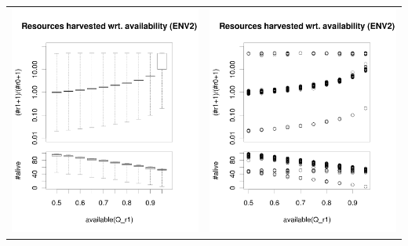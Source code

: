 \documentclass[a4paper,10pt]{article}
\begin{document}
\begin{table}[H]
\begin{tabular}{cc}
\includegraphics[width=\imgSize]{../images/5StaticEnv/ratioAndRep_staticEnv2LogY}&\includegraphics[width=\imgSize]{../images/5StaticEnv/ratioAndRep_staticEnvPlot2LogY}\\
\end{tabular}
\end{table}
\end{document}
